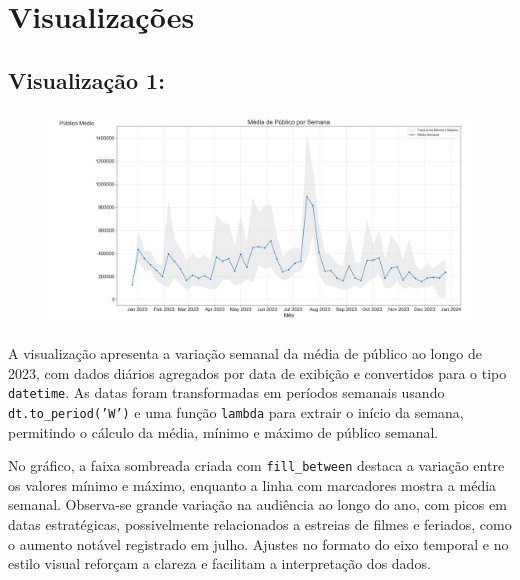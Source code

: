\documentclass{article}
\begin{document}
\pagebreak
\linespread{1.5}
\section{Visualizações}
\subsection*{Visualização 1:}
\begin{figure}[H]
    \centerline{\includegraphics[width =\linewidth]{img/Figure_1.png}}
\end{figure}
A visualização apresenta a variação semanal da média de público ao longo de 2023, com dados diários agregados por data de exibição e convertidos para o tipo \texttt{datetime}. As datas foram transformadas em períodos semanais usando \texttt{dt.to\_period('W')} e uma função \texttt{lambda} para extrair o início da semana, permitindo o cálculo da média, mínimo e máximo de público semanal.

No gráfico, a faixa sombreada criada com \texttt{fill\_between} destaca a variação entre os valores mínimo e máximo, enquanto a linha com marcadores mostra a média semanal. Observa-se grande variação na audiência ao longo do ano, com picos em datas estratégicas, possivelmente relacionados a estreias de filmes e feriados, como o aumento notável registrado em julho. Ajustes no formato do eixo temporal e no estilo visual reforçam a clareza e facilitam a interpretação dos dados.
\end{document}
